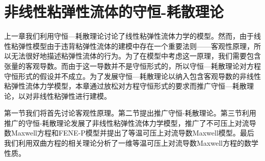  \chapter{非线性粘弹性流体的守恒-耗散理论}

% 
上一章我们利用守恒—耗散理论讨论了线性粘弹性流体力学的模型。然而，由于线性粘弹性模型由于违背粘弹性流体的建模中存在一个重要法则——客观性原理，所以无法很好地描述粘弹性流体的行为\cite{oldroyd1950formulation,dimitrienko2010nonlinear,edwards1990remarks}。为了在模型中考虑这一原理，我们需要包含张量的客观导数。而由于这一导数并不是守恒形式的，所以守恒—耗散理论对方程守恒形式的假设并不成立。为了发展守恒—耗散理论以纳入包含客观导数的非线性粘弹性流体力学模型，本章通过放松对方程守恒形式的要求而推广守恒—耗散理论，以对非线性粘弹性进行建模。

第一节我们将首先讨论客观性原理。第二节提出推广守恒-耗散理论。第三节利用推广的守恒-耗散理论发展了非线性粘弹性流体力学模型，推广了不可压上对流导数Maxwell方程和FENE-P模型并提出了等温可压上对流导数Maxwell模型。最后我们利用双曲方程的相关理论分析了一维等温可压上对流导数Maxwell方程的数学性质。

